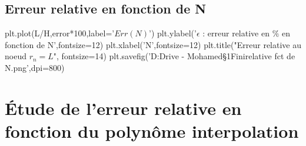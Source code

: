 \documentclass[a4paper,10pt]{report} %
\begin{document}
\subsection{Erreur relative en fonction de N}

\begin{python}
plt.plot(L/H,error*100,label='$Err(N)$')
plt.ylabel('$\epsilon$ : erreur relative en $\%$ en fonction de N',fontsize=12)
plt.xlabel('N',fontsize=12)
plt.title("Erreur relative au noeud $r_{n}=L$", fontsize=14)
plt.savefig('D:\Google Drive - Mohamed\Cours\S1\Element Fini\Erreur relative fct de N.png',dpi=800)
\end{python}

\section{Étude de l'erreur relative en fonction du polynôme interpolation}
\begin{python}
\end{python}
\end{document}
